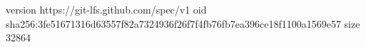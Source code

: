 version https://git-lfs.github.com/spec/v1
oid sha256:3fe51671316d63557f82a7324936f26f7f4fb76fb7ea396ce18f1100a1569e57
size 32864
